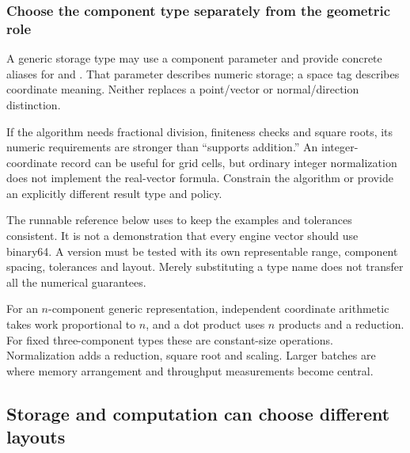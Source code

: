 \subsubsection{Choose the component type separately from the geometric role}\label{02-foundations-ii-ch037-choose-the-component-type-separately-from-the-geometric-role}

\hypertarget{02-foundations-ii-ch037-choose-the-component-type-separately-from-the-geometric-role}{}

A generic storage type may use a component parameter and provide concrete aliases for  and . That parameter describes numeric storage; a space tag describes coordinate meaning. Neither replaces a point/vector or normal/direction distinction.

If the algorithm needs fractional division, finiteness checks and square roots, its numeric requirements are stronger than ``supports addition.'' An integer-coordinate record can be useful for grid cells, but ordinary integer normalization does not implement the real-vector formula. Constrain the algorithm or provide an explicitly different result type and policy.

The runnable reference below uses  to keep the examples and tolerances consistent. It is not a demonstration that every engine vector should use binary64. A  version must be tested with its own representable range, component spacing, tolerances and layout. Merely substituting a type name does not transfer all the numerical guarantees.

For an \(n\)-component generic representation, independent coordinate arithmetic takes work proportional to \(n\), and a dot product uses \(n\) products and a reduction. For fixed three-component types these are constant-size operations. Normalization adds a reduction, square root and scaling. Larger batches are where memory arrangement and throughput measurements become central.

\subsection{Storage and computation can choose different layouts}\label{02-foundations-ii-ch037-storage-and-computation-can-choose-different-layouts}

\hypertarget{02-foundations-ii-ch037-storage-and-computation-can-choose-different-layouts}{}

